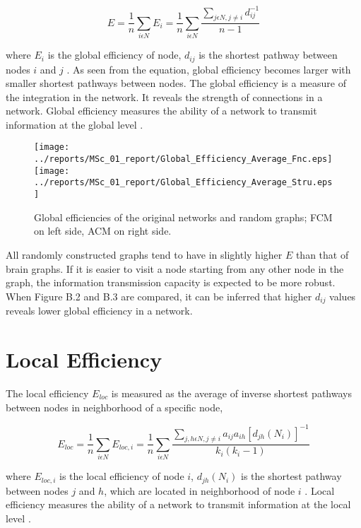 \begin{equation}
E = \frac{1}{n}\sum\limits_{i \epsilon N} E_i = \frac{1}{n}\sum\limits_{i \epsilon N} \frac{\sum\limits_{j \epsilon N, j\neq i}d_{ij}^{-1}}{n-1 }
\end{equation}

where $E_i$ is the global efficiency of node, $d_{ij}$ is the shortest pathway between nodes $i$ and $j$ \citep{LAT01}. As seen from the equation, global efficiency becomes larger with smaller shortest pathways between nodes. The global efficiency is a measure of the integration in the network. It reveals the strength of connections in a network. Global efficiency measures the ability of a network to transmit information at the global level \citep{XYZDA}.


\begin{figure}[htbp]
 
  \centering
	 \texttt{[image: ../reports/MSc\_01\_report/Global\_Efficiency\_Average\_Fnc.eps]}
	 \texttt{[image: ../reports/MSc\_01\_report/Global\_Efficiency\_Average\_Stru.eps]}
  \caption[Global Efficiency]{Global efficiencies of the original networks and random graphs; FCM on left side, ACM on right side.} 
    \label{fig:Global Efficiency}
 	
\end{figure}

All randomly constructed graphs tend to have in slightly higher $E$ than that of brain graphs. If it is easier to visit a node starting from any other node in the graph, the information transmission capacity is expected to be more robust. When Figure B.2 and B.3 are compared, it can be inferred that higher $d_{ij}$ values reveals lower global efficiency in a network. 



\section{Local Efficiency}
The local efficiency $E_{loc}$ is measured as the average of inverse shortest pathways between nodes in neighborhood of a specific node, 

\begin{equation}
E_{loc} = \frac{1}{n}\sum\limits_{i \epsilon N} E_{loc,i} = \frac{1}{n}\sum\limits_{i \epsilon N} \frac{\sum\limits_{j,h \epsilon N, j\neq i} a_{ij} a_{ih}[d_{jh}(N_i)]^{-1}}{k_i(k_i - 1) }
\end{equation}

where $E_{loc,i}$ is the local efficiency of node $i$, $d_{jh}(N_i)$ is the shortest pathway between nodes $j$ and $h$, which are located in neighborhood of node $i$ \citep{LAT01}. Local efficiency measures the ability of a network to transmit information at the local level \citep{XYZDA}.


